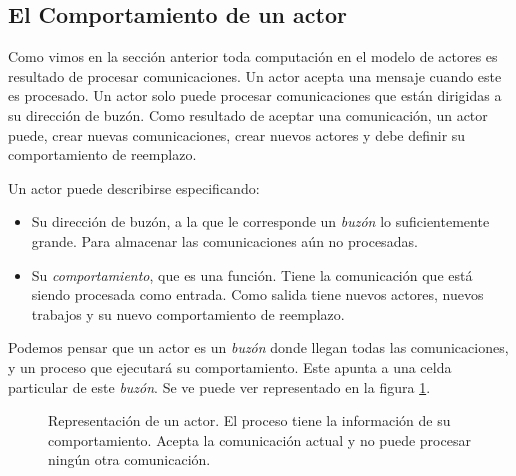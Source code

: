 \subsection{El Comportamiento de un actor}

Como vimos en la sección anterior toda computación en el modelo de actores es resultado de procesar comunicaciones. Un actor acepta una mensaje cuando este es procesado. Un actor solo puede procesar comunicaciones que están dirigidas a su dirección de buzón. Como resultado de aceptar una comunicación, un actor puede, crear nuevas comunicaciones, crear nuevos actores y debe definir su comportamiento de reemplazo.


Un actor puede describirse especificando:

\begin{itemize}
 \item Su dirección de buzón, a la que le corresponde un \textit{buzón} lo suficientemente grande. Para almacenar las comunicaciones aún no procesadas.
 \item Su \textit{comportamiento}, que es una función. Tiene la comunicación que está siendo procesada como entrada. Como salida tiene nuevos actores, nuevos trabajos y su nuevo comportamiento de reemplazo.
\end{itemize}

Podemos pensar que un actor es un \textit{buzón} donde llegan todas las comunicaciones, y un proceso que ejecutará su comportamiento. Este apunta a una celda particular de este \textit{buzón}. Se ve puede ver representado en la figura \ref{fig:mailqueue}.

\begin{figure}[H]
\caption{Representación de un actor. El proceso tiene la información de su comportamiento. Acepta la comunicación actual y no puede procesar ningún otra comunicación.}
\label{fig:mailqueue}
\end{figure}

